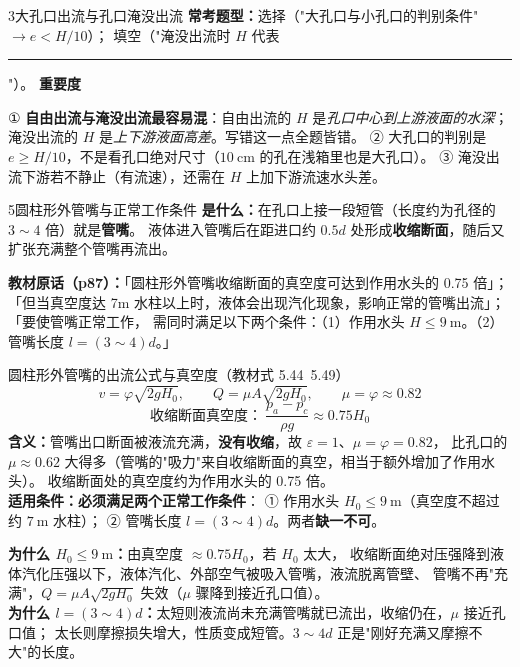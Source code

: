 \begin{kaodian}{3}{大孔口出流与孔口淹没出流}
\textbf{常考题型：}选择（"大孔口与小孔口的判别条件"$\to e<H/10$）；
填空（"淹没出流时 $H$ 代表\rule{2cm}{0.4pt}"）。
\textbf{重要度 }\quad{}\quad{}

\begin{yicuo}
① \textbf{自由出流与淹没出流最容易混}：自由出流的 $H$ 是\emph{孔口中心到上游液面的水深}；
淹没出流的 $H$ 是\emph{上下游液面高差}。写错这一点全题皆错。
② 大孔口的判别是 $e\ge H/10$，不是看孔口绝对尺寸（$10\ \mathrm{cm}$ 的孔在浅箱里也是大孔口）。
③ 淹没出流下游若不静止（有流速），还需在 $H$ 上加下游流速水头差。
\end{yicuo}
\end{kaodian}

\begin{kaodian}{5}{圆柱形外管嘴与正常工作条件}
\textbf{是什么：}在孔口上接一段短管（长度约为孔径的 $3\sim4$ 倍）就是\textbf{管嘴}。
液体进入管嘴后在距进口约 $0.5d$ 处形成\textbf{收缩断面}，随后又扩张充满整个管嘴再流出。

\noindent\textbf{教材原话（p87）：}「圆柱形外管嘴收缩断面的真空度可达到作用水头的 0.75 倍」；
「但当真空度达 7m 水柱以上时，液体会出现汽化现象，影响正常的管嘴出流」；「要使管嘴正常工作，
需同时满足以下两个条件：（1）作用水头 $H\le9\ \mathrm{m}$。（2）管嘴长度 $l=(3\sim4)d$。」

\begin{gongshi}{圆柱形外管嘴的出流公式与真空度（教材式 5.44~5.49）}
\[ v=\varphi\sqrt{2gH_0},\qquad Q=\mu A\sqrt{2gH_0},\qquad \mu=\varphi\approx0.82 \]
\[ \text{收缩断面真空度：}\ \frac{p_a-p_c}{\rho g}\approx0.75H_0 \]
\textbf{含义：}管嘴出口断面被液流充满，\textbf{没有收缩}，故 $\varepsilon=1$、$\mu=\varphi=0.82$，
比孔口的 $\mu\approx0.62$ 大得多（管嘴的"吸力"来自收缩断面的真空，相当于额外增加了作用水头）。
收缩断面处的真空度约为作用水头的 0.75 倍。\\
\textbf{适用条件：}\textbf{必须满足两个正常工作条件}：
① 作用水头 $H_0\le 9\ \mathrm{m}$（真空度不超过约 $7\ \mathrm{m}$ 水柱）；
② 管嘴长度 $l=(3\sim4)d$。两者\textbf{缺一不可}。
\end{gongshi}

\begin{jielun}
\textbf{为什么 $H_0\le9\ \mathrm{m}$：}由真空度 $\approx0.75H_0$，若 $H_0$ 太大，
收缩断面绝对压强降到液体汽化压强以下，液体汽化、外部空气被吸入管嘴，液流脱离管壁、
管嘴不再"充满"，$Q=\mu A\sqrt{2gH_0}$ 失效（$\mu$ 骤降到接近孔口值）。\\
\textbf{为什么 $l=(3\sim4)d$：}太短则液流尚未充满管嘴就已流出，收缩仍在，$\mu$ 接近孔口值；
太长则摩擦损失增大，性质变成短管。$3\sim4d$ 正是"刚好充满又摩擦不大"的长度。
\end{jielun}


\end{kaodian}

